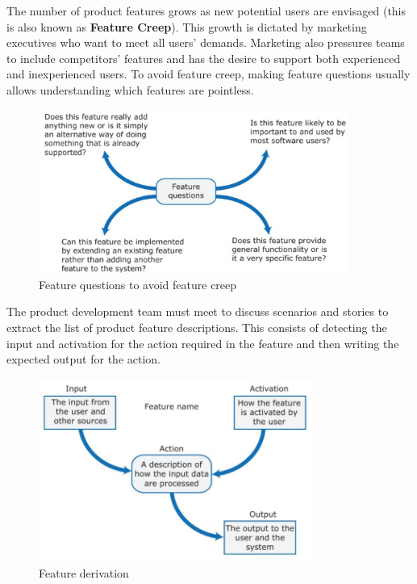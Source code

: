 The number of product features grows as new potential users are envisaged (this is also known as \textbf{Feature Creep}). This growth is dictated by marketing executives who want to meet all users' demands. Marketing also pressures teams to include competitors' features and has the desire to support both experienced and inexperienced users. To avoid feature creep, making feature questions usually allows understanding which features are pointless.

\begin{figure} [H]
    \centering
    \includegraphics[width=0.9\textwidth]{images/Stories/feature_creep.png}
    \caption{Feature questions to avoid feature creep}
    \label{fig:featurecreep}
\end{figure}
\newpage

The product development team must meet to discuss scenarios and stories to extract the list of product feature descriptions. This consists of detecting the input and activation for the action required in the feature and then writing the expected output for the action.

\begin{figure} [H]
    \centering
    \includegraphics[width=0.8\textwidth]{images/Stories/Feature_derivation.png}
    \caption{Feature derivation}
    \label{fig:featurederivation}
\end{figure}
